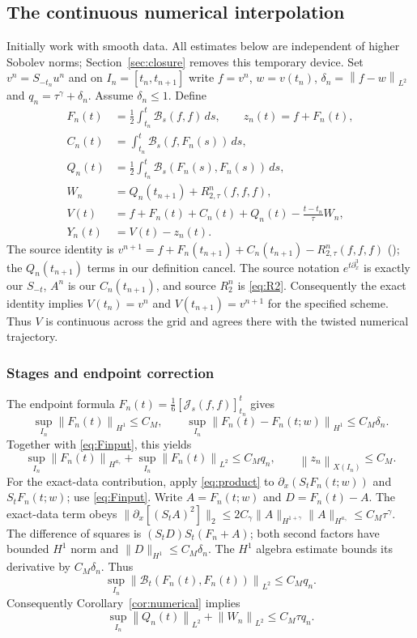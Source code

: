 \documentclass[11pt]{article}
\theoremstyle{remark}\newtheorem{remark}[theorem]{Remark}
\newcommand{\cJ}{\mathcal J}
\newcommand{\cB}{\mathcal B}
\newcommand{\norm}[2][]{\left\lVert #2\right\rVert_{#1}}
\begin{document}
\subsection{The continuous numerical interpolation}
Initially work with smooth data. All estimates below are independent of higher
Sobolev norms; Section~\ref{sec:closure} removes this temporary device.
Set $v^n=S_{-t_n}u^n$ and on $I_n=[t_n,t_{n+1}]$ write
$f=v^n$, $w=v(t_n)$, $\delta_n=\norm[L^2]{f-w}$ and
$q_n=\tau^\gamma+\delta_n$. Assume $\delta_n\leq1$.
Define
\begin{align*}
F_n(t)&=\tfrac12\int_{t_n}^t\cB_s(f,f)\,ds,\qquad z_n(t)=f+F_n(t),\\
C_n(t)&=\int_{t_n}^t\cB_s(f,F_n(s))\,ds,\\
Q_n(t)&=\tfrac12\int_{t_n}^t\cB_s(F_n(s),F_n(s))\,ds,\\
W_n&=Q_n(t_{n+1})+R_{2,\tau}^{n}(f,f,f),\\
V(t)&=f+F_n(t)+C_n(t)+Q_n(t)-\frac{t-t_n}{\tau}W_n,\\
Y_n(t)&=V(t)-z_n(t).
\end{align*}
The source identity is $v^{n+1}=f+F_n(t_{n+1})+C_n(t_{n+1})
-R_{2,\tau}^n(f,f,f)$ (\cite[Eqs.~(4.20)--(4.23),(5.2)]{LW}); the
$Q_n(t_{n+1})$ terms in our definition cancel. The source notation
$e^{t\partial_x^3}$ is exactly our $S_{-t}$, $A^n$ is our $C_n(t_{n+1})$,
and source $R_2^n$ is \eqref{eq:R2}. Consequently the exact identity
\cite[Eqs.~(5.2)--(5.4)]{LW} implies
$V(t_n)=v^n$ and $V(t_{n+1})=v^{n+1}$ for the specified scheme.
Thus $V$ is continuous across the grid and agrees there with the
twisted numerical trajectory.

\subsubsection*{Stages and endpoint correction}
The endpoint formula $F_n(t)=\tfrac16[\cJ_s(f,f)]_{t_n}^t$ gives
\[
\sup_{I_n}\norm[H^1]{F_n(t)}\leq C_M,
\qquad
\sup_{I_n}\norm[H^1]{F_n(t)-F_n(t;w)}\leq C_M\delta_n.
\]
Together with \eqref{eq:Finput}, this yields
\begin{equation}\label{eq:Fbounds}
\sup_{I_n}\norm[H^{a_\gamma}]{F_n(t)}+
\sup_{I_n}\norm[L^2]{F_n(t)}\leq C_Mq_n,
\qquad \norm[X(I_n)]{z_n}\leq C_M.
\end{equation}
For the exact-data contribution, apply \eqref{eq:product} to
$\partial_x(S_tF_n(t;w))$ and $S_tF_n(t;w)$; use \eqref{eq:Finput}.
Write $A=F_n(t;w)$ and $D=F_n(t)-A$. The exact-data term
obeys $\|\partial_x[(S_tA)^2]\|_2\leq
2C_\gamma\|A\|_{H^{1+\gamma}}\|A\|_{H^{a_\gamma}}\leq C_M\tau^\gamma$.
The difference of squares is $(S_tD)S_t(F_n+A)$; both second factors have
bounded $H^1$ norm and $\|D\|_{H^1}\leq C_M\delta_n$. The $H^1$
algebra estimate bounds its derivative by $C_M\delta_n$. Thus
\[
\sup_{I_n}\norm[L^2]{\cB_t(F_n(t),F_n(t))}\leq C_Mq_n.
\]
Consequently Corollary~\ref{cor:numerical} implies
\begin{equation}\label{eq:W}
\sup_{I_n}\norm[L^2]{Q_n(t)}+\norm[L^2]{W_n}\leq C_M\tau q_n.
\end{equation}
\end{document}
